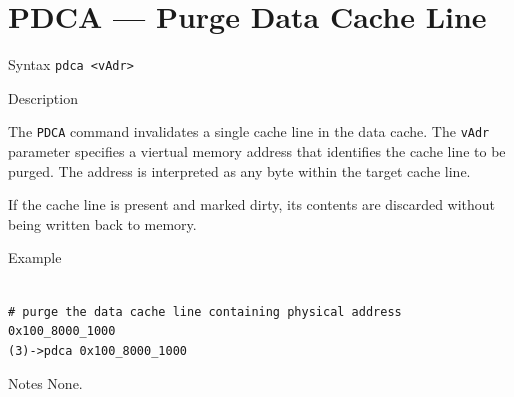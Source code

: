 %
%
\pagebreak
\section*{PDCA — Purge Data Cache Line}

\begin{iPageDescEntry}{Syntax}
\texttt{pdca <vAdr>}
\end{iPageDescEntry}

\begin{iPageDescEntry}{Description}

The \texttt{PDCA} command invalidates a single cache line in the data cache. The
\texttt{vAdr} parameter specifies a viertual memory address that identifies the
cache line to be purged. The address is interpreted as any byte within the target
cache line.

If the cache line is present and marked dirty, its contents are discarded without
being written back to memory.

\end{iPageDescEntry}

\begin{iPageDescOpEntry}{Example}
\begin{lstlisting}[style=iPageOpStyle]

# purge the data cache line containing physical address 0x100_8000_1000
(3)->pdca 0x100_8000_1000

\end{lstlisting}
\end{iPageDescOpEntry}

\begin{iPageDescEntry}{Notes}
None.
\end{iPageDescEntry}